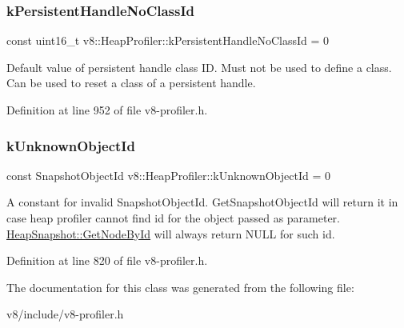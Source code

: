 \subsubsection{\texorpdfstring{k\+Persistent\+Handle\+No\+Class\+Id}{kPersistentHandleNoClassId}}
{\footnotesize\ttfamily const uint16\+\_\+t v8\+::\+Heap\+Profiler\+::k\+Persistent\+Handle\+No\+Class\+Id = 0\hspace{0.3cm}{\ttfamily [static]}}

Default value of persistent handle class ID. Must not be used to define a class. Can be used to reset a class of a persistent handle. 

Definition at line 952 of file v8-\/profiler.\+h.

\mbox{\label{classv8_1_1HeapProfiler_abf2b9d8facb18473f9b124ab8baf5786}} 
\subsubsection{\texorpdfstring{k\+Unknown\+Object\+Id}{kUnknownObjectId}}
{\footnotesize\ttfamily const Snapshot\+Object\+Id v8\+::\+Heap\+Profiler\+::k\+Unknown\+Object\+Id = 0\hspace{0.3cm}{\ttfamily [static]}}

A constant for invalid Snapshot\+Object\+Id. Get\+Snapshot\+Object\+Id will return it in case heap profiler cannot find id for the object passed as parameter. \mbox{\hyperlink{classv8_1_1HeapSnapshot_a0aec9c1535c27bc8b1b55579969203fc}{Heap\+Snapshot\+::\+Get\+Node\+By\+Id}} will always return N\+U\+LL for such id. 

Definition at line 820 of file v8-\/profiler.\+h.



The documentation for this class was generated from the following file\+:\begin{DoxyCompactItemize}
\item 
v8/include/v8-\/profiler.\+h\end{DoxyCompactItemize}
